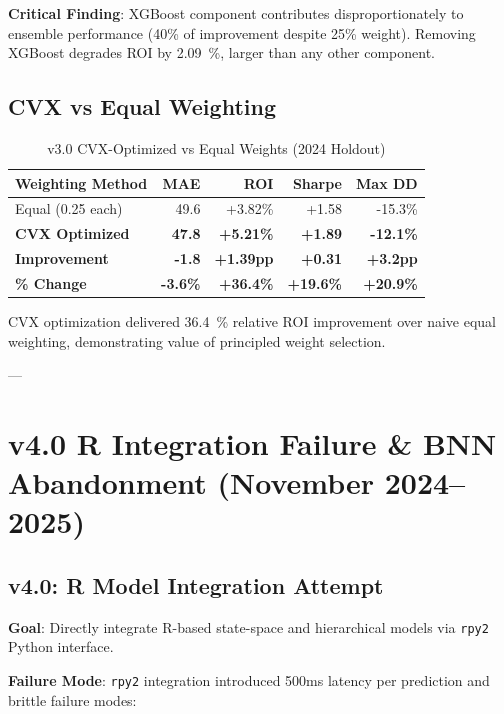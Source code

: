 \textbf{Critical Finding}: XGBoost component contributes disproportionately to ensemble performance (40\% of improvement despite 25\% weight). Removing XGBoost degrades ROI by \SI{2.09}{\percent}, larger than any other component.

\subsection{CVX vs Equal Weighting}

\begin{table}[h]
\centering
\caption{v3.0 CVX-Optimized vs Equal Weights (2024 Holdout)}
\label{tab:v3-cvx-vs-equal}
\begin{tabular}{lrrrr}
\toprule
\textbf{Weighting Method} & \textbf{MAE} & \textbf{ROI} & \textbf{Sharpe} & \textbf{Max DD} \\
\midrule
Equal (0.25 each) & 49.6 & +3.82\% & +1.58 & -15.3\% \\
\textbf{CVX Optimized} & \textbf{47.8} & \textbf{+5.21\%} & \textbf{+1.89} & \textbf{-12.1\%} \\
\midrule
\textbf{Improvement} & \textbf{-1.8} & \textbf{+1.39pp} & \textbf{+0.31} & \textbf{+3.2pp} \\
\textbf{\% Change} & \textbf{-3.6\%} & \textbf{+36.4\%} & \textbf{+19.6\%} & \textbf{+20.9\%} \\
\bottomrule
\end{tabular}
\end{table}

CVX optimization delivered \SI{36.4}{\percent} relative ROI improvement over naive equal weighting, demonstrating value of principled weight selection.

---

\section{v4.0 R Integration Failure \& BNN Abandonment (November 2024--2025)}

\subsection{v4.0: R Model Integration Attempt}

\textbf{Goal}: Directly integrate R-based state-space and hierarchical models via \texttt{rpy2} Python interface.

\textbf{Failure Mode}: \texttt{rpy2} integration introduced 500ms latency per prediction and brittle failure modes:

